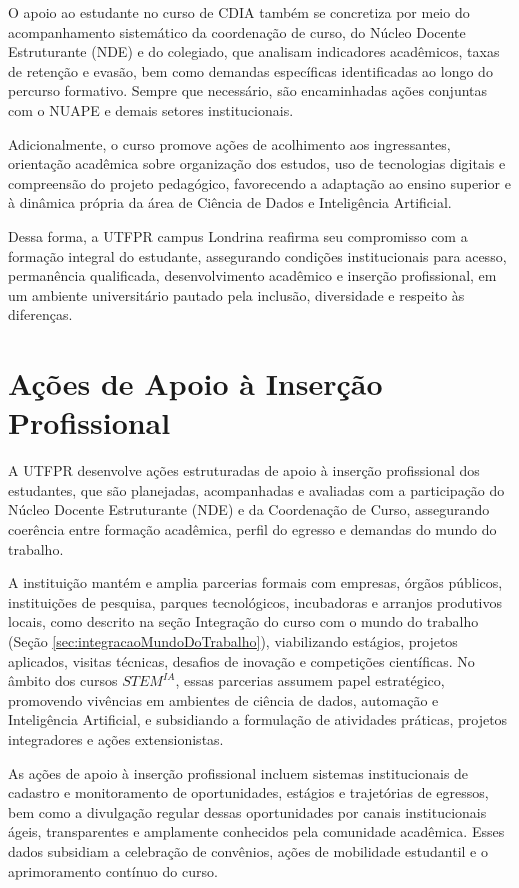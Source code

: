 O apoio ao estudante no curso de CDIA também se concretiza por meio do acompanhamento sistemático da coordenação de curso, do Núcleo Docente Estruturante (NDE) e do colegiado, que analisam indicadores acadêmicos, taxas de retenção e evasão, bem como demandas específicas identificadas ao longo do percurso formativo. Sempre que necessário, são encaminhadas ações conjuntas com o NUAPE e demais setores institucionais.

Adicionalmente, o curso promove ações de acolhimento aos ingressantes, orientação acadêmica sobre organização dos estudos, uso de tecnologias digitais e compreensão do projeto pedagógico, favorecendo a adaptação ao ensino superior e à dinâmica própria da área de Ciência de Dados e Inteligência Artificial.

Dessa forma, a UTFPR campus Londrina reafirma seu compromisso com a formação integral do estudante, assegurando condições institucionais para acesso, permanência qualificada, desenvolvimento acadêmico e inserção profissional, em um ambiente universitário pautado pela inclusão, diversidade e respeito às diferenças.

\section{Ações de Apoio à Inserção Profissional}

A UTFPR desenvolve ações estruturadas de apoio à inserção profissional dos estudantes, que são planejadas, acompanhadas e avaliadas com a participação do Núcleo Docente Estruturante (NDE) e da Coordenação de Curso, assegurando coerência entre formação acadêmica, perfil do egresso e demandas do mundo do trabalho.

A instituição mantém e amplia parcerias formais com empresas, órgãos públicos, instituições de pesquisa, parques tecnológicos, incubadoras e arranjos produtivos locais, como descrito na seção Integração do curso com o mundo do trabalho (Seção \ref{sec:integracaoMundoDoTrabalho}), viabilizando estágios, projetos aplicados, visitas técnicas, desafios de inovação e competições científicas. No âmbito dos cursos $STEM^{IA}$, essas parcerias assumem papel estratégico, promovendo vivências em ambientes de ciência de dados, automação e Inteligência Artificial, e subsidiando a formulação de atividades práticas, projetos integradores e ações extensionistas.

As ações de apoio à inserção profissional incluem sistemas institucionais de cadastro e monitoramento de oportunidades, estágios e trajetórias de egressos, bem como a divulgação regular dessas oportunidades por canais institucionais ágeis, transparentes e amplamente conhecidos pela comunidade acadêmica. Esses dados subsidiam a celebração de convênios, ações de mobilidade estudantil e o aprimoramento contínuo do curso.

